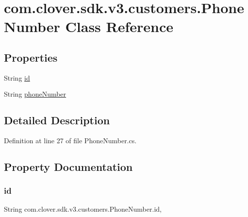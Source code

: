 \hypertarget{classcom_1_1clover_1_1sdk_1_1v3_1_1customers_1_1_phone_number}{}\section{com.\+clover.\+sdk.\+v3.\+customers.\+Phone\+Number Class Reference}
\label{classcom_1_1clover_1_1sdk_1_1v3_1_1customers_1_1_phone_number}
\subsection*{Properties}
\begin{DoxyCompactItemize}
\item 
String \hyperlink{classcom_1_1clover_1_1sdk_1_1v3_1_1customers_1_1_phone_number_aa3e5ad58834a7c06c2dfc4a37b62b530}{id}
\item 
String \hyperlink{classcom_1_1clover_1_1sdk_1_1v3_1_1customers_1_1_phone_number_a00f32c354ed57ac1e607deff5a6066d0}{phone\+Number}
\end{DoxyCompactItemize}


\subsection{Detailed Description}


Definition at line 27 of file Phone\+Number.\+cs.



\subsection{Property Documentation}
\mbox{\label{classcom_1_1clover_1_1sdk_1_1v3_1_1customers_1_1_phone_number_aa3e5ad58834a7c06c2dfc4a37b62b530}} 
\subsubsection{\texorpdfstring{id}{id}}
{\footnotesize\ttfamily String com.\+clover.\+sdk.\+v3.\+customers.\+Phone\+Number.\+id\hspace{0.3cm}{\ttfamily [get]}, {\ttfamily [set]}}



